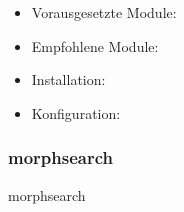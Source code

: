 \begin{itemize}[parsep=0pt, itemsep=5.0pt plus 2.0pt minus 1.0pt, leftmargin=*]
	\item Vorausgesetzte Module:
	
	\item Empfohlene Module:
	
	\item Installation: \standardinstall
	
	\item Konfiguration:
	
\end{itemize}



\newpage
\subsubsection{morphsearch}\label{subsub:morphsearch}
morphsearch
